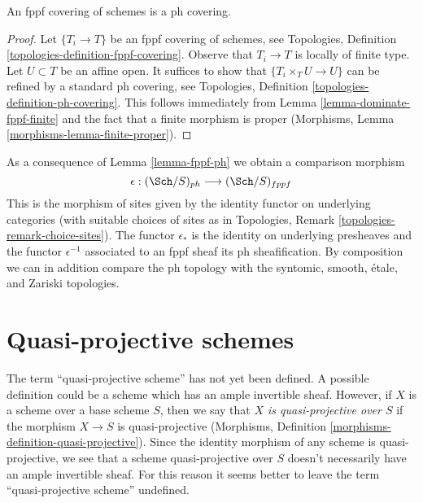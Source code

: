 \begin{lemma}
\label{lemma-fppf-ph}
An fppf covering of schemes is a ph covering.
\end{lemma}

\begin{proof}
Let $\{T_i \to T\}$ be an fppf covering of schemes, see
Topologies, Definition \ref{topologies-definition-fppf-covering}.
Observe that $T_i \to T$ is locally of finite type.
Let $U \subset T$ be an affine open.
It suffices to show that $\{T_i \times_T U \to U\}$
can be refined by a standard ph covering, see
Topologies, Definition \ref{topologies-definition-ph-covering}.
This follows immediately from Lemma \ref{lemma-dominate-fppf-finite}
and the fact that a finite morphism is proper
(Morphisms, Lemma \ref{morphisms-lemma-finite-proper}).
\end{proof}

\begin{remark}
\label{remark-change-topologies}
As a consequence of Lemma \ref{lemma-fppf-ph} we obtain a comparison morphism
$$
\epsilon : (\Sch/S)_{ph} \longrightarrow (\Sch/S)_{fppf}
$$
This is the morphism of sites given by the identity functor
on underlying categories (with suitable choices of sites
as in Topologies, Remark \ref{topologies-remark-choice-sites}).
The functor $\epsilon_*$ is the identity on underlying presheaves
and the functor $\epsilon^{-1}$ associated to an fppf sheaf
its ph sheafification.
By composition we can in addition compare the ph topology
with the syntomic, smooth, \'etale, and Zariski topologies.
\end{remark}




\section{Quasi-projective schemes}
\label{section-quasi-projective}

\noindent
The term ``quasi-projective scheme'' has not yet been defined.
A possible definition could be a scheme which has an ample invertible
sheaf. However, if $X$ is a scheme over a base scheme $S$, then
we say that {\it $X$ is quasi-projective over $S$} if the morphism
$X \to S$ is quasi-projective
(Morphisms, Definition \ref{morphisms-definition-quasi-projective}).
Since the identity morphism of any scheme is quasi-projective, we
see that a scheme quasi-projective over $S$ doesn't necessarily
have an ample invertible sheaf. For this reason it seems better to
leave the term ``quasi-projective scheme'' undefined.

